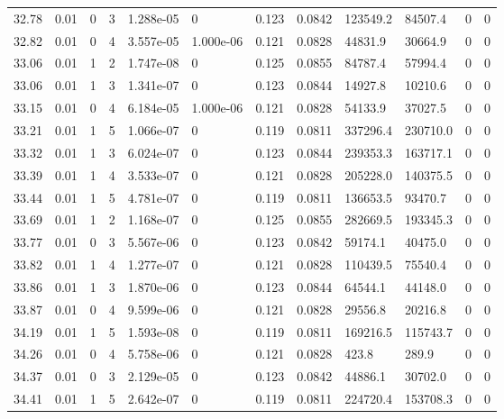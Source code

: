 \documentclass[preview]{standalone}
\begin{document}
{{{{{{{{{\begin{tabular}{L{1.2cm}C{1.2cm} C{0.3cm}C{0.5cm} C{1.4cm}C{1.4cm} C{1.4cm}C{1.4cm} C{1.6cm}C{1.6cm} C{1.6cm}C{1.6cm}}
  32.78  &  0.01  & 0     &  3 &  1.288e-05  & 0  &  0.123&   0.0842& 123549.2 & 84507.4   &  0 & 0  \\ 
  32.82  &  0.01  & 0     &  4 &  3.557e-05  & 1.000e-06  &  0.121&   0.0828& 44831.9 & 30664.9   &  0 & 0  \\ 
  33.06  &  0.01  & 1     &  2 &  1.747e-08  & 0  &  0.125&   0.0855& 84787.4 & 57994.4   &  0 & 0  \\ 
  33.06  &  0.01  & 1     &  3 &  1.341e-07  & 0  &  0.123&   0.0844& 14927.8 & 10210.6   &  0 & 0  \\ 
  33.15  &  0.01  & 0     &  4 &  6.184e-05  & 1.000e-06  &  0.121&   0.0828& 54133.9 & 37027.5   &  0 & 0  \\ 
  33.21  &  0.01  & 1     &  5 &  1.066e-07  & 0  &  0.119&   0.0811& 337296.4 & 230710.0   &  0 & 0  \\ 
  33.32  &  0.01  & 1     &  3 &  6.024e-07  & 0  &  0.123&   0.0844& 239353.3 & 163717.1   &  0 & 0  \\ 
  33.39  &  0.01  & 1     &  4 &  3.533e-07  & 0  &  0.121&   0.0828& 205228.0 & 140375.5   &  0 & 0  \\ 
  33.44  &  0.01  & 1     &  5 &  4.781e-07  & 0  &  0.119&   0.0811& 136653.5 & 93470.7   &  0 & 0  \\ 
  33.69  &  0.01  & 1     &  2 &  1.168e-07  & 0  &  0.125&   0.0855& 282669.5 & 193345.3   &  0 & 0  \\ 
  33.77  &  0.01  & 0     &  3 &  5.567e-06  & 0  &  0.123&   0.0842& 59174.1 & 40475.0   &  0 & 0  \\ 
  33.82  &  0.01  & 1     &  4 &  1.277e-07  & 0  &  0.121&   0.0828& 110439.5 & 75540.4   &  0 & 0  \\ 
  33.86  &  0.01  & 1     &  3 &  1.870e-06  & 0  &  0.123&   0.0844& 64544.1 & 44148.0   &  0 & 0  \\ 
  33.87  &  0.01  & 0     &  4 &  9.599e-06  & 0  &  0.121&   0.0828& 29556.8 & 20216.8   &  0 & 0  \\ 
  34.19  &  0.01  & 1     &  5 &  1.593e-08  & 0  &  0.119&   0.0811& 169216.5 & 115743.7   &  0 & 0  \\ 
  34.26  &  0.01  & 0     &  4 &  5.758e-06  & 0  &  0.121&   0.0828& 423.8 & 289.9   &  0 & 0  \\ 
  34.37  &  0.01  & 0     &  3 &  2.129e-05  & 0  &  0.123&   0.0842& 44886.1 & 30702.0   &  0 & 0  \\ 
  34.41  &  0.01  & 1     &  5 &  2.642e-07  & 0  &  0.119&   0.0811& 224720.4 & 153708.3   &  0 & 0  \\ 

\end{tabular}}}}}}}}}}
\end{document}
